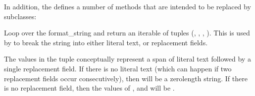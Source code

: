 \documentclass[letterpaper,10pt,english]{sphinxmanual}
\begin{document}
\begin{fulllineitems}
\begin{fulllineitems}
\end{fulllineitems}


In addition, the {\hyperref[\detokenize{string:string.Formatter}]{}} defines a number of methods that are
intended to be replaced by subclasses:

\vspace{5px}

\begin{fulllineitems}
\label{\detokenize{string:string.Formatter.parse}}
Loop over the format\_string and return an iterable of tuples
(, , , ).  This is used
by {\hyperref[\detokenize{string:string.Formatter.vformat}]{}} to break the string into either literal text, or
replacement fields.

The values in the tuple conceptually represent a span of literal text
followed by a single replacement field.  If there is no literal text
(which can happen if two replacement fields occur consecutively), then
 will be a zero\sphinxhyphen{}length string.  If there is no replacement
field, then the values of ,  and 
will be .

\end{fulllineitems}


\vspace{5px}


\end{fulllineitems}
\end{document}

